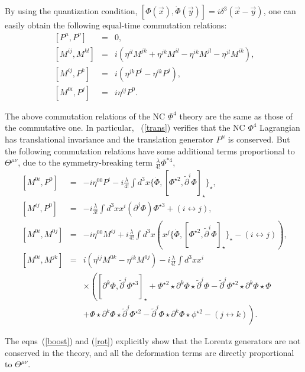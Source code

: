 \documentclass[a4paper,a4paper]{article}
\begin{document}
By using the quantization condition, 
$[\Phi(\vec x),\dot{\Phi}(\vec y)]=i\delta^{3}(\vec x-\vec y)$, 
one can easily obtain the following equal-time commutation relations:
\begin{eqnarray}
~[P^\mu,P^\nu] & = & 0, \label{trans}\\
~[M^{ij},M^{kl}] & = & i(\eta^{il}M^{jk}+\eta^{jk}M^{il}-\eta^{ik}M^{jl}-\eta^{jl}M^{ik}), \\
~[M^{ij},P^k] & = & i(\eta^{jk}P^i-\eta^{ik}P^j), \\
~[M^{0i},P^j] & = & i\eta^{ij}P^0.
\end{eqnarray}

The above commutation relations of the NC $\Phi^4$ theory are the same as 
those of the commutative one. In particular, ~(\ref{trans}) verifies that the 
NC $\Phi^4$ Lagrangian has translational invariance and 
the translation generator 
$P^\mu$ is conserved. But the following commutation relations have some additional 
terms proportional to $\Theta^{\mu\nu}$, 
due to the symmetry-breaking term $\frac {\lambda }{4!} \Phi^{*4}$,
\begin{eqnarray}
~[M^{0i},P^0] & = & -i\eta^{00}P^i-i\frac{\lambda}{4!}
\int d^3x\{\dot{\Phi},[\Phi^{\star 2},\tilde{\partial}^i\Phi]_\star\}_\star , 
\label{boost}\\
~[M^{ij},P^0] & = & -i\frac{\lambda}{3!}\int d^3x x^i(\partial^j\Phi)\Phi^{\star 3} + 
(i\leftrightarrow j), 
\label{rot}\\
~[M^{0i},M^{0j}] & = & -i\eta^{00}M^{ij}+i\frac{\lambda}{4!}
\int d^3x \left(x^j\{\dot{\Phi},[\Phi^{\star 2},\tilde{\partial}^i\Phi]_\star\}_\star 
-(i\leftrightarrow j)\right), \\
~[M^{0i},M^{jk}] & = & i(\eta^{ij}M^{0k}-\eta^{ik}M^{0j})
-i\frac{\lambda}{4!} \int d^3x x^i \nonumber\\
&&\times\left([\partial^k\Phi ,\tilde{\partial}^j\Phi^{\star 3}]_\star \right. 
+\Phi^{\star 2}\star\partial^k\Phi\star\tilde{\partial}^j\Phi 
-\tilde{\partial}^j\Phi^{\star 2}\star\partial^k\Phi\star\Phi \nonumber \\
&& \left.+\Phi\star\partial^k\Phi\star\tilde{\partial}^j\Phi^{\star 2} 
-\tilde{\partial}^j\Phi\star\partial^k\Phi\star\phi^{\star 2}-(j \leftrightarrow k)\right).
\end{eqnarray}

The eqns~(\ref{boost}) and (\ref{rot}) explicitly show that the Lorentz generators 
are not conserved
in the theory, and all the deformation terms are directly proportional to $\Theta^{\mu\nu}$.
\end{document}
